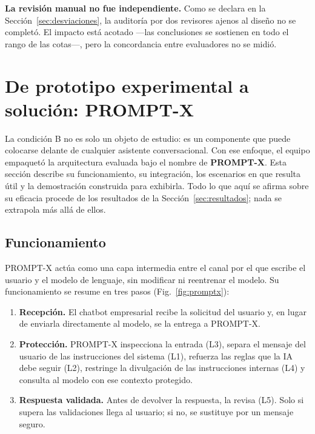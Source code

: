 \documentclass[twocolumn]{article}
\begin{document}
\textbf{La revisión manual no fue independiente.} Como se declara en la
Sección~\ref{sec:desviaciones}, la auditoría por dos revisores ajenos al
diseño no se completó. El impacto está acotado ---las conclusiones se sostienen
en todo el rango de las cotas---, pero la concordancia entre evaluadores no se
midió.


\FloatBarrier


\section{De prototipo experimental a solución: PROMPT-X}
\label{sec:promptx}

La condición B no es solo un objeto de estudio: es un componente que puede
colocarse delante de cualquier asistente conversacional. Con ese enfoque, el
equipo empaquetó la arquitectura evaluada bajo el nombre de \textbf{PROMPT-X}.
Esta sección describe su funcionamiento, su integración, los escenarios en que
resulta útil y la demostración construida para exhibirla. Todo lo que aquí se
afirma sobre su eficacia procede de los resultados de la
Sección~\ref{sec:resultados}; nada se extrapola más allá de ellos.

\subsection{Funcionamiento}

PROMPT-X actúa como una capa intermedia entre el canal por el que escribe el
usuario y el modelo de lenguaje, sin modificar ni reentrenar el modelo. Su
funcionamiento se resume en tres pasos (Fig.~\ref{fig:promptx}):

\begin{enumerate}
    \item \textbf{Recepción.} El chatbot empresarial recibe la solicitud del
    usuario y, en lugar de enviarla directamente al modelo, se la entrega a
    PROMPT-X.
    \item \textbf{Protección.} PROMPT-X inspecciona la entrada (L3), separa el
    mensaje del usuario de las instrucciones del sistema (L1), refuerza las
    reglas que la IA debe seguir (L2), restringe la divulgación de las
    instrucciones internas (L4) y consulta al modelo con ese contexto
    protegido.
    \item \textbf{Respuesta validada.} Antes de devolver la respuesta, la
    revisa (L5). Solo si supera las validaciones llega al usuario; si no, se
    sustituye por un mensaje seguro.
\end{enumerate}
\end{document}
